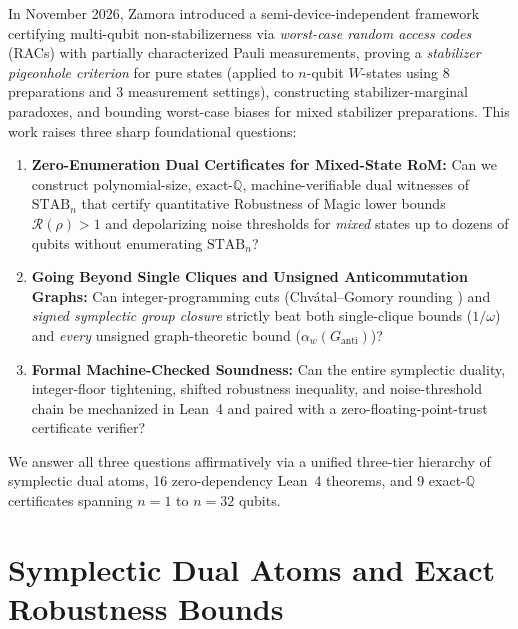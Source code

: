 \documentclass[11pt,a4paper]{article}
\theoremstyle{definition}
\theoremstyle{remark}
\newcommand{\Q}{\mathbb{Q}}
\newcommand{\STAB}{\mathrm{STAB}}
\newcommand{\RoM}{\mathcal{R}}
\begin{document}
In November 2026, Zamora \cite{Zamora2026RAC} introduced a semi-device-independent framework certifying multi-qubit non-stabilizerness via \emph{worst-case random access codes} (RACs) with partially characterized Pauli measurements, proving a \emph{stabilizer pigeonhole criterion} for pure states (applied to $n$-qubit $W$-states using 8 preparations and 3 measurement settings), constructing stabilizer-marginal paradoxes, and bounding worst-case biases for mixed stabilizer preparations. This work raises three sharp foundational questions:
\begin{enumerate}[leftmargin=1.8em,itemsep=2pt]
  \item \textbf{Zero-Enumeration Dual Certificates for Mixed-State RoM:} Can we construct polynomial-size, exact-$\Q$, machine-verifiable dual witnesses of $\STAB_n$ that certify quantitative Robustness of Magic lower bounds $\RoM(\rho) > 1$ and depolarizing noise thresholds for \emph{mixed} states up to dozens of qubits without enumerating $\STAB_n$?
  \item \textbf{Going Beyond Single Cliques and Unsigned Anticommutation Graphs:} Can integer-programming cuts (Chv\'atal--Gomory rounding \cite{Schrijver1986}) and \emph{signed symplectic group closure} strictly beat both single-clique bounds ($1/\omega$) and \emph{every} unsigned graph-theoretic bound ($\alpha_w(G_{\mathrm{anti}})$)?
  \item \textbf{Formal Machine-Checked Soundness:} Can the entire symplectic duality, integer-floor tightening, shifted robustness inequality, and noise-threshold chain be mechanized in Lean~4 \cite{deMoura2021Lean4} and paired with a zero-floating-point-trust certificate verifier?
\end{enumerate}

We answer all three questions affirmatively via a unified three-tier hierarchy of symplectic dual atoms, 16 zero-dependency Lean~4 theorems, and 9 exact-$\Q$ certificates spanning $n = 1$ to $n = 32$ qubits.

\section{Symplectic Dual Atoms and Exact Robustness Bounds}
\label{sec:theory}
\end{document}

